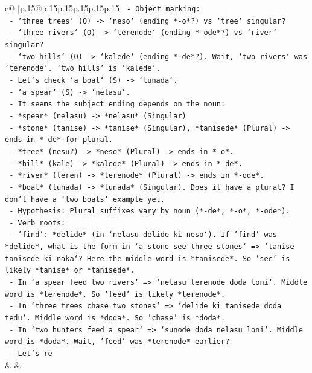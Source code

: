 \documentclass{article}
\begin{document}
{\begin{supertabular}{c@{$\;$}|p{.15\linewidth}@{}p{.15\linewidth}p{.15\linewidth}p{.15\linewidth}p{.15\linewidth}p{.15\linewidth}}
{{{\texttt{   {-} Object marking:} \\
\texttt{     {-} `three trees` (O) {-}> `neso` (ending *{-}o*?) vs `tree` singular?} \\
\texttt{     {-} `three rivers` (O) {-}> `terenode` (ending *{-}ode*?) vs `river` singular?} \\
\texttt{     {-} `two hills` (O) {-}> `kalede` (ending *{-}de*?). Wait, `two rivers` was `terenode`. `two hills` is `kalede`.} \\
\texttt{     {-} Let's check `a boat` (S) {-}> `tunada`.} \\
\texttt{     {-} `a spear` (S) {-}> `nelasu`.} \\
\texttt{     {-} It seems the subject ending depends on the noun:} \\
\texttt{       {-} *spear* (nelasu) {-}> *nelasu* (Singular)} \\
\texttt{       {-} *stone* (tanise) {-}> *tanise* (Singular), *tanisede* (Plural) {-}> ends in *{-}de* for plural.} \\
\texttt{       {-} *tree* (nesu?) {-}> *neso* (Plural) {-}> ends in *{-}o*.} \\
\texttt{       {-} *hill* (kale) {-}> *kalede* (Plural) {-}> ends in *{-}de*.} \\
\texttt{       {-} *river* (teren) {-}> *terenode* (Plural) {-}> ends in *{-}ode*.} \\
\texttt{       {-} *boat* (tunada) {-}> *tunada* (Singular). Does it have a plural? I don't have a `two boats` example yet.} \\
\texttt{     {-} Hypothesis: Plural suffixes vary by noun (*{-}de*, *{-}o*, *{-}ode*).} \\
\texttt{   {-} Verb roots:} \\
\texttt{     {-} 'find': *delide* (in `nelasu delide ki neso`). If 'find' was *delide*, what is the form in `a stone see three stones` => `tanise tanisede ki naka`? Here the middle word is *tanisede*. So 'see' is likely *tanise* or *tanisede*.} \\
\texttt{     {-} In `a spear feed two rivers` => `nelasu terenode doda loni`. Middle word is *terenode*. So 'feed' is likely *terenode*.} \\
\texttt{     {-} In `three trees chase two stones` => `delide ki tanisede doda tedu`. Middle word is *doda*. So 'chase' is *doda*.} \\
\texttt{     {-} In `two hunters feed a spear` => `sunode doda nelasu loni`. Middle word is *doda*. Wait, 'feed' was *terenode* earlier?} \\
\texttt{     {-} Let's re} \\
            }
        }
    }
    & & \\ \\


\end{supertabular}}
\end{document}
